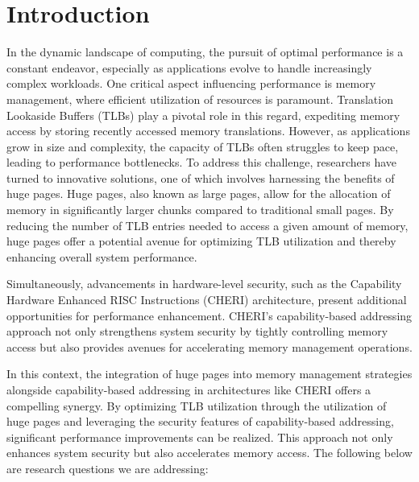 \chapter{Introduction}

\ifpdf
    \graphicspath{{Introduction/Figs/Raster/}{Introduction/Figs/PDF/}{Introduction/Figs/}}
\else
    \graphicspath{{Introduction/Figs/Vector/}{Introduction/Figs/}}
\fi

In the dynamic landscape of computing, the pursuit of optimal performance is a constant endeavor, 
especially as applications evolve to handle increasingly complex workloads. 
One critical aspect influencing performance is memory management, where efficient 
utilization of resources is paramount. Translation Lookaside Buffers (TLBs) play a 
pivotal role in this regard, expediting memory access by storing recently accessed memory translations.
However, as applications grow in size and complexity, the capacity of TLBs often struggles to 
keep pace, leading to performance bottlenecks. To address this challenge, researchers have 
turned to innovative solutions, one of which involves harnessing the benefits of huge pages.
Huge pages, also known as large pages, allow for the allocation of memory in significantly 
larger chunks compared to traditional small pages. By reducing the number of TLB entries 
needed to access a given amount of memory, huge pages offer a potential avenue for optimizing 
TLB utilization and thereby enhancing overall system performance.
\newline

Simultaneously, advancements in hardware-level security, such as the Capability Hardware 
Enhanced RISC Instructions (CHERI) architecture, present additional opportunities for 
performance enhancement. CHERI's capability-based addressing approach not only strengthens 
system security by tightly controlling memory access but also provides avenues for 
accelerating memory management operations.
\newline

In this context, the integration of huge pages into memory management 
strategies alongside capability-based addressing in architectures like 
CHERI offers a compelling synergy. By optimizing TLB utilization through the 
utilization of huge pages and leveraging the security features of capability-based addressing, 
significant performance improvements can be realized. This approach not only enhances 
system security but also accelerates memory access. The following below are research questions 
we are addressing:
\newline

